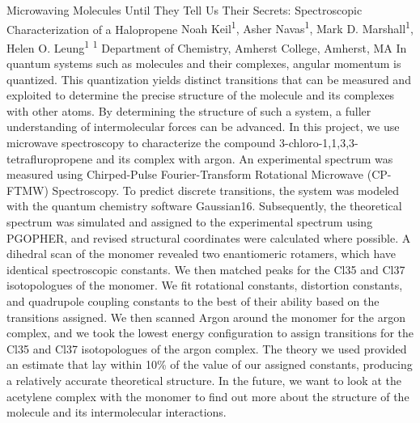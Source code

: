 \makeabstract
    {
    Microwaving Molecules Until They Tell Us Their Secrets: Spectroscopic Characterization of a Halopropene
    }
    {
    Noah Keil\textsuperscript{1}, Asher Navas\textsuperscript{1}, Mark D. Marshall\textsuperscript{1}, Helen O. Leung\textsuperscript{1}
    }
    {
    \textsuperscript{1} Department of Chemistry, Amherst College, Amherst, MA
    }
    {
    In quantum systems such as molecules and their complexes, angular momentum is quantized. This quantization yields distinct transitions that can be measured and exploited to determine the precise structure of the molecule and its complexes with other atoms. By determining the structure of such a system, a fuller understanding of intermolecular forces can be advanced. In this project, we use microwave spectroscopy to characterize the compound 3-chloro-1,1,3,3-tetrafluropropene and its complex with argon.
    }
    {
    An experimental spectrum was measured using Chirped-Pulse Fourier-Transform Rotational Microwave (CP-FTMW) Spectroscopy. To predict discrete transitions, the system was modeled with the quantum chemistry software Gaussian16. Subsequently, the theoretical spectrum was simulated and assigned to the experimental spectrum using PGOPHER, and revised structural coordinates were calculated where possible. 
    }
    {
    A dihedral scan of the monomer revealed two enantiomeric rotamers, which have identical spectroscopic constants. We then matched peaks for the Cl35 and Cl37 isotopologues of the monomer. We fit rotational constants, distortion constants, and quadrupole coupling constants to the best of their ability based on the transitions assigned. We then scanned Argon around the monomer for the argon complex, and we took the lowest energy configuration to assign transitions for the Cl35 and Cl37 isotopologues of the argon complex.
    }
    {
    The theory we used provided an estimate that lay within 10\% of the value of our assigned constants, producing a relatively accurate theoretical structure. In the future, we want to look at the acetylene complex with the monomer to find out more about the structure of the molecule and its intermolecular interactions.
    }

    \newpage
    